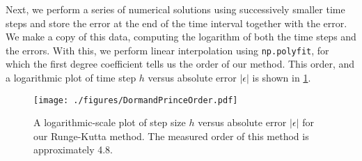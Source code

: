 	Next, we perform a series of numerical solutions using successively smaller time steps and store the error at the end of the time interval together with the error. We make a copy of this data, computing the logarithm of both the time steps and the errors. With this, we perform linear interpolation using \lstinline{np.polyfit}, for which the first degree coefficient tells us the order of our method. This order, and a logarithmic plot of time step \(h\) versus absolute error \(|\epsilon|\) is shown in \ref{fig:dormand-prince-order}.
	
	\begin{figure}[H]
		\centering
		\texttt{[image: ./figures/DormandPrinceOrder.pdf]}
		\caption{A logarithmic-scale plot of step size \(h\) versus absolute error \(|\epsilon|\) for our Runge-Kutta method. The measured order of this method is approximately 4.8. }
		\label{fig:dormand-prince-order}
	\end{figure}
	
